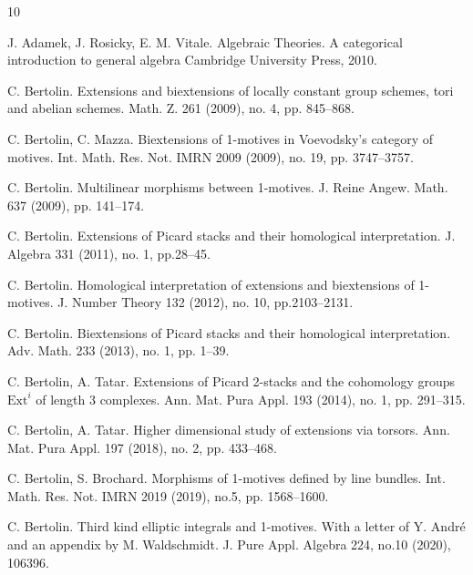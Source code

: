 \documentclass[11pt]{amsart}
\theoremstyle{definition}
\numberwithin{equation}{section}
\begin{document}

\begin{thebibliography}{10}

 J. Adamek, J. Rosicky, E. M. Vitale.
\newblock Algebraic Theories. A categorical introduction to general algebra
\newblock Cambridge University Press, 2010.



C. Bertolin.
Extensions and biextensions of locally constant group schemes, tori and abelian schemes.
\newblock Math. Z. 261 (2009), no. 4, pp. 845--868.


 C. Bertolin, C. Mazza.
\newblock Biextensions of 1-motives in Voevodsky's category of motives.
\newblock Int. Math. Res. Not. IMRN 2009 (2009), no. 19, pp. 3747--3757.


C. Bertolin.
\newblock Multilinear morphisms between 1-motives. 
\newblock J. Reine Angew. Math. 637 (2009), pp. 141--174.

C. Bertolin.
\newblock Extensions of Picard stacks and their homological interpretation. \newblock J. Algebra 331 (2011), no. 1, pp.28--45.


C. Bertolin.
\newblock Homological interpretation of extensions and biextensions of 1-motives.
\newblock J. Number Theory 132 (2012), no. 10, pp.2103--2131.

C. Bertolin.
\newblock Biextensions of Picard stacks and their homological interpretation. 
\newblock Adv. Math. 233 (2013), no. 1, pp. 1--39.


C. Bertolin, A. Tatar.
\newblock Extensions of Picard 2-stacks and the cohomology groups $\mathrm{Ext}^i$ of length 3 complexes.
\newblock Ann. Mat. Pura Appl. 193 (2014), no. 1, pp. 291--315.


C. Bertolin, A. Tatar.
\newblock Higher dimensional study of extensions via torsors.                                                                                                            
\newblock Ann. Mat. Pura Appl. 197 (2018), no. 2, pp. 433--468.

C. Bertolin, S. Brochard.
\newblock Morphisms of 1-motives defined by line bundles.  
\newblock Int. Math. Res. Not. IMRN 2019 (2019), no.5, pp. 1568--1600.

C. Bertolin.
\newblock Third kind elliptic integrals and 1-motives. With a letter of Y. Andr\'e and an appendix by M. Waldschmidt.
\newblock J. Pure Appl. Algebra 224, no.10 (2020), 106396.


\end{thebibliography}
\end{document}
